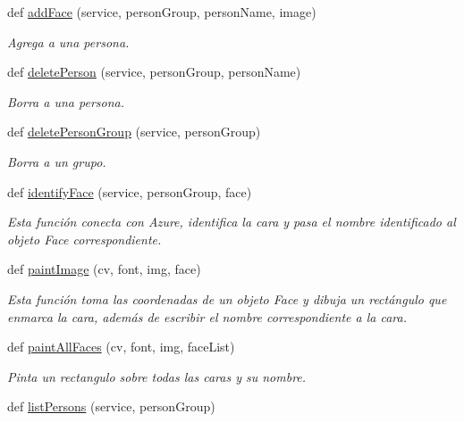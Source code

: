 \begin{DoxyCompactItemize}
def \mbox{\hyperlink{namespace_f_c_module_1_1_f_c_tools_adeeadfac92a0113ba74f1b140c09b14f}{add\+Face}} (service, person\+Group, person\+Name, image)
\begin{DoxyCompactList}\small\item\em Agrega a una persona. \end{DoxyCompactList}\item 
def \mbox{\hyperlink{namespace_f_c_module_1_1_f_c_tools_aedafa1474c8976ae1f9c1a859cc26984}{delete\+Person}} (service, person\+Group, person\+Name)
\begin{DoxyCompactList}\small\item\em Borra a una persona. \end{DoxyCompactList}\item 
def \mbox{\hyperlink{namespace_f_c_module_1_1_f_c_tools_a780cf43ca7953c654750759dc80a0f48}{delete\+Person\+Group}} (service, person\+Group)
\begin{DoxyCompactList}\small\item\em Borra a un grupo. \end{DoxyCompactList}\item 
def \mbox{\hyperlink{namespace_f_c_module_1_1_f_c_tools_ab3df8ddd7530893bcd38b5e5321f9576}{identify\+Face}} (service, person\+Group, face)
\begin{DoxyCompactList}\small\item\em Esta función conecta con Azure, identifica la cara y pasa el nombre identificado al objeto Face correspondiente. \end{DoxyCompactList}\item 
def \mbox{\hyperlink{namespace_f_c_module_1_1_f_c_tools_a476cbac52df88ddaae5b43da6465013e}{paint\+Image}} (cv, font, img, face)
\begin{DoxyCompactList}\small\item\em Esta función toma las coordenadas de un objeto Face y dibuja un rectángulo que enmarca la cara, además de escribir el nombre correspondiente a la cara. \end{DoxyCompactList}\item 
def \mbox{\hyperlink{namespace_f_c_module_1_1_f_c_tools_a10adfb32d85cc6173537e97ee7afea11}{paint\+All\+Faces}} (cv, font, img, face\+List)
\begin{DoxyCompactList}\small\item\em Pinta un rectangulo sobre todas las caras y su nombre. \end{DoxyCompactList}\item 
def \mbox{\hyperlink{namespace_f_c_module_1_1_f_c_tools_a84b5fde279bce289df81e5c2f9ffe09d}{list\+Persons}} (service, person\+Group)

\end{DoxyCompactItemize}
